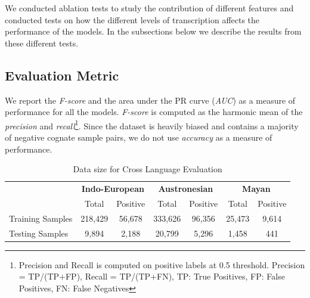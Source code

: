 \documentclass[11pt,letterpaper]{article}
\begin{document}
We conducted ablation tests to study the contribution of different features and conducted tests on how the different levels of transcription affects the performance of the models. In the subsections below we describe the results from these different tests.

\subsection{Evaluation Metric}

We report the \textit{F-score} and the area under the PR curve (\textit{AUC}) as a measure of performance for all the models. \textit{F-score} is computed as the harmonic mean of the \textit{precision} and \textit{recall}\footnote{Precision and Recall is computed on positive labels at 0.5 threshold. Precision = TP/(TP+FP), Recall = TP/(TP+FN), TP: True Positives, FP: False Positives, FN: False Negatives}. Since the dataset is heavily biased and contains a majority of negative cognate sample pairs, we do not use \textit{accuracy} as a measure of performance.

\begin{table}[t]
\centering
\begin{tabular}{lcccccc}
\multicolumn{1}{c}{\textbf{}} & \multicolumn{2}{c}{\textbf{Indo-European}} & \multicolumn{2}{c}{\textbf{Austronesian}} & \multicolumn{2}{c}{\textbf{Mayan}} \\
\multicolumn{1}{c}{}          & Total               & Positive             & Total               & Positive            & Total           & Positive         \\
Training Samples              & 218,429             & 56,678               & 333,626             & 96,356              & 25,473          & 9,614            \\
Testing Samples               & 9,894               & 2,188                & 20,799              & 5,296               & 1,458           & 441             
\end{tabular}
\caption{Data size for Cross Language Evaluation}
\label{CL_count}
\end{table}
\end{document}
